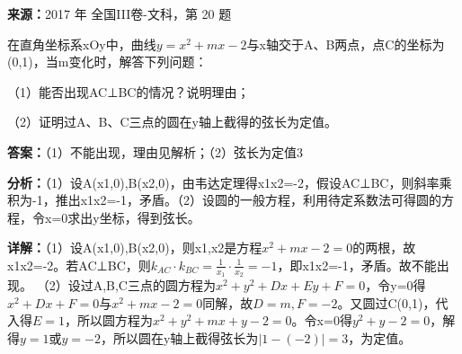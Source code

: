 \begin{question}[points=12]
\textbf{来源：}2017 年 全国III卷-文科，第 20 题\par
在直角坐标系xOy中，曲线$y=x^2+mx-2$与x轴交于A、B两点，点C的坐标为(0,1)，当m变化时，解答下列问题：

（1）能否出现AC⊥BC的情况？说明理由；

（2）证明过A、B、C三点的圆在y轴上截得的弦长为定值。
\begin{solution}
\textbf{答案：}（1）不能出现，理由见解析；（2）弦长为定值3

\textbf{分析：}（1）设A(x1,0),B(x2,0)，由韦达定理得x1x2=-2，假设AC⊥BC，则斜率乘积为-1，推出x1x2=-1，矛盾。（2）设圆的一般方程，利用待定系数法可得圆的方程，令x=0求出y坐标，得到弦长。

\textbf{详解：}（1）设A(x1,0),B(x2,0)，则x1,x2是方程$x^2+mx-2=0$的两根，故x1x2=-2。若AC⊥BC，则$k_{AC}\cdot k_{BC}=\frac{1}{x_1}\cdot\frac{1}{x_2}=-1$，即x1x2=-1，矛盾。故不能出现。
（2）设过A,B,C三点的圆方程为$x^2+y^2+Dx+Ey+F=0$，令y=0得$x^2+Dx+F=0$与$x^2+mx-2=0$同解，故$D=m,F=-2$。又圆过C(0,1)，代入得$E=1$，所以圆方程为$x^2+y^2+mx+y-2=0$。令x=0得$y^2+y-2=0$，解得$y=1$或$y=-2$，所以圆在y轴上截得弦长为$|1-(-2)|=3$，为定值。
\end{solution}
\end{question}

